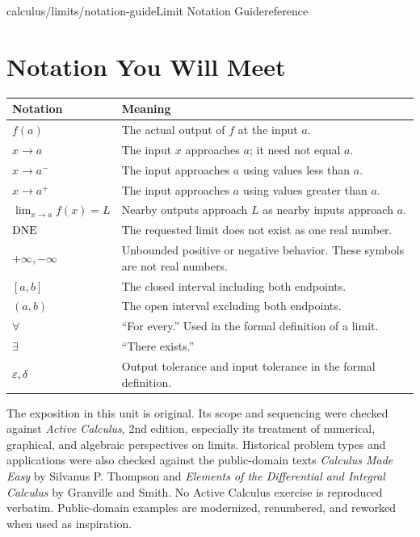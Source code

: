 \begin{webpage}{calculus/limits/notation-guide}{Limit Notation Guide}{reference}
\chapter*{Notation You Will Meet}

\begin{longtable}{@{}p{}p{}@{}}
\toprule
\textbf{Notation} & \textbf{Meaning}\\
\midrule
\endhead
\(f(a)\) & The actual output of \(f\) at the input \(a\).\\
\(x\to a\) & The input \(x\) approaches \(a\); it need not equal \(a\).\\
\(x\to a^-\) & The input approaches \(a\) using values less than \(a\).\\
\(x\to a^+\) & The input approaches \(a\) using values greater than \(a\).\\
\(\displaystyle\lim_{x\to a}f(x)=L\) & Nearby outputs approach \(L\) as nearby inputs approach \(a\).\\
\(\mathrm{DNE}\) & The requested limit does not exist as one real number.\\
\(+\infty,-\infty\) & Unbounded positive or negative behavior. These symbols are not real numbers.\\
\([a,b]\) & The closed interval including both endpoints.\\
\((a,b)\) & The open interval excluding both endpoints.\\
\(\forall\) & ``For every.'' Used in the formal definition of a limit.\\
\(\exists\) & ``There exists.''\\
\(\varepsilon,\delta\) & Output tolerance and input tolerance in the formal definition.\\
\bottomrule
\end{longtable}

\begin{bgsource}
The exposition in this unit is original. Its scope and sequencing were checked against \emph{Active Calculus}, 2nd edition, especially its treatment of numerical, graphical, and algebraic perspectives on limits. Historical problem types and applications were also checked against the public-domain texts \emph{Calculus Made Easy} by Silvanus P. Thompson and \emph{Elements of the Differential and Integral Calculus} by Granville and Smith. No Active Calculus exercise is reproduced verbatim. Public-domain examples are modernized, renumbered, and reworked when used as inspiration.
\end{bgsource}
\end{webpage}
